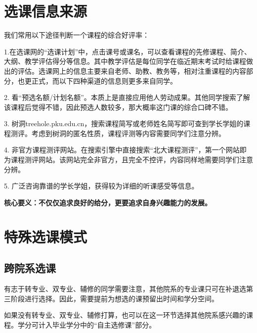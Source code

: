 \section{选课信息来源}
我们常用以下途径判断一个课程的综合好评率：

\vspace{10pt}

1.在选课网的“选课计划”中，点击课号或课名，可以查看课程的先修课程、简介、大纲、教学评估得分等信息。其中教学评估是每位同学在临近期末考试时给课程做出的评估。选课网上的信息主要来自老师、助教、教务等，相对注重课程的内容部分，也更正式，而以下四种渠道的信息则更多来自同学。

\vspace{10pt}

2. 看“预选名额/计划名额”。本质上是直接应用他人劳动成果。其他同学搜索了解该课程后觉得不错，因此预选人数较多，那大概率这门课的综合口碑不错。

\vspace{10pt}

3. 树洞treehole.pku.edu.cn，搜索课程简写或老师姓名简写即可查到学长学姐的课程测评。考虑到树洞的匿名性质，课程评测等内容需要同学们注意分辨。

\vspace{10pt}

4. 非官方课程测评网站。在搜索引擎中直接搜索“北大课程测评”，第一个网站即为课程测评网站。该网站完全非官方，且完全不控评，内容同样地需要同学们注意分辨。

\vspace{10pt}

5. 广泛咨询靠谱的学长学姐，获得较为详细的听课感受等信息。

\vspace{10pt}

\textbf{核心要义：不仅仅追求良好的给分，更要追求自身兴趣能力的发展。}

\section{特殊选课模式}
\subsection{跨院系选课}
有志于转专业、双专业、辅修的同学需要注意，其他院系的专业课只可在补退选第三阶段进行选择。因此，需要提前为想选的课预留出时间和学分空间。

\vspace{10pt}

如果没有转专业、双专业、辅修打算，也可以在这一环节选择其他院系感兴趣的课程。学分可计入毕业学分中的“自主选修课”部分。

